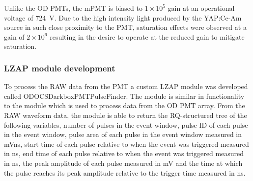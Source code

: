 Unlike the OD PMTs, the mPMT is biased to $1\times10^5$ gain at an operational voltage of 724~V. Due to the high intensity light produced by the YAP:Ce-Am source in such close proximity to the PMT, saturation effects were observed at a gain of $2\times10^6$ resulting in the desire to operate at the reduced gain to mitigate saturation.
\subsubsection{LZAP module development}
To process the RAW data from the PMT a custom LZAP module was developed called {\selectfont ODOCSDarkboxPMTPulseFinder}. The module is similar in functionality to the module which is used to process data from the OD PMT array. From the RAW waveform data, the module is able to return the RQ-structured tree of the following variables, number of pulses in the event window, pulse ID of each pulse in the event window, pulse area of each pulse in the event window measured in mVns, start time of each pulse relative to when the event was triggered measured in ns, end time of each pulse relative to when the event was triggered measured in ns, the peak amplitude of each pulse measured in mV and the time at which the pulse reaches its peak amplitude relative to the trigger time measured in ns.
